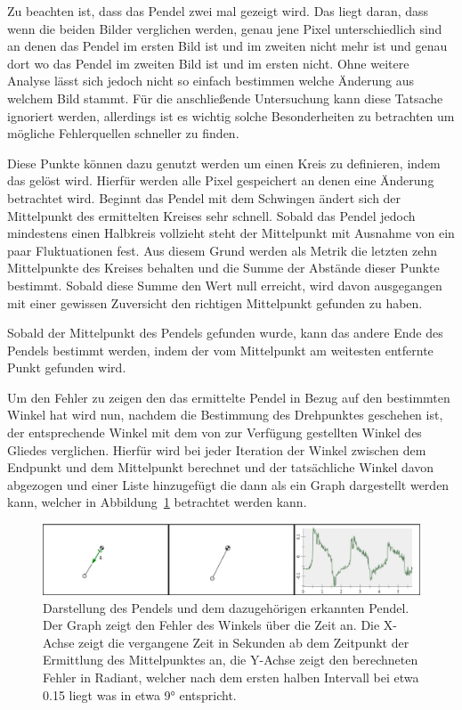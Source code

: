 Zu beachten ist, dass das Pendel zwei mal gezeigt wird.
Das liegt daran, dass wenn die beiden Bilder verglichen werden, genau jene Pixel unterschiedlich sind an denen das Pendel im ersten Bild ist und im zweiten nicht mehr ist und genau dort wo das Pendel im zweiten Bild ist und im ersten nicht.
Ohne weitere Analyse lässt sich jedoch nicht so einfach bestimmen welche Änderung aus welchem Bild stammt.
Für die anschließende Untersuchung kann diese Tatsache ignoriert werden, allerdings ist es wichtig solche Besonderheiten zu betrachten um mögliche Fehlerquellen schneller zu finden.

Diese Punkte können dazu genutzt werden um einen Kreis zu definieren, indem das  gelöst wird.
Hierfür werden alle Pixel gespeichert an denen eine Änderung betrachtet wird.
Beginnt das Pendel mit dem Schwingen ändert sich der Mittelpunkt des ermittelten Kreises sehr schnell.
Sobald das Pendel jedoch mindestens einen Halbkreis vollzieht steht der Mittelpunkt mit Ausnahme von ein paar Fluktuationen fest.
Aus diesem Grund werden als Metrik die letzten zehn Mittelpunkte des Kreises behalten und die Summe der Abstände dieser Punkte bestimmt.
Sobald diese Summe den Wert null erreicht, wird davon ausgegangen mit einer gewissen Zuversicht den richtigen Mittelpunkt gefunden zu haben.

Sobald der Mittelpunkt des Pendels gefunden wurde, kann das andere Ende des Pendels bestimmt werden, indem der vom Mittelpunkt am weitesten entfernte Punkt gefunden wird.

Um den Fehler zu zeigen den das ermittelte Pendel in Bezug auf den bestimmten Winkel hat wird nun, nachdem die Bestimmung des Drehpunktes geschehen ist, der entsprechende Winkel mit dem von  zur Verfügung gestellten Winkel des Gliedes verglichen.
Hierfür wird bei jeder Iteration der Winkel zwischen dem Endpunkt und dem Mittelpunkt berechnet und der tatsächliche Winkel davon abgezogen und einer Liste hinzugefügt die dann als ein Graph dargestellt werden kann, welcher in Abbildung~\ref{fig:pendel_prediction} betrachtet werden kann.

\begin{figure}[htb]
	\includegraphics[width=\textwidth]{gfx/compare_images_2.png}
	\caption{Darstellung des Pendels und dem dazugehörigen erkannten Pendel. Der Graph zeigt den Fehler des Winkels über die Zeit an. Die X-Achse zeigt die vergangene Zeit in Sekunden ab dem Zeitpunkt der Ermittlung des Mittelpunktes an, die Y-Achse zeigt den berechneten Fehler in Radiant, welcher nach dem ersten halben Intervall bei etwa 0.15 liegt was in etwa 9° entspricht.}
	\label{fig:pendel_prediction}
\end{figure}

